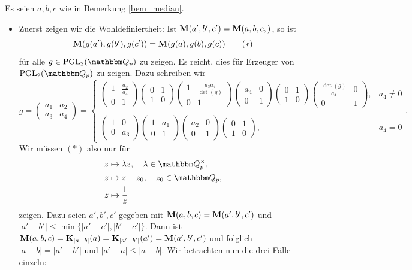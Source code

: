 \documentclass[a4paper, 12pt, twoside]{article}
\begin{document}
\bew Es seien $a,b,c$ wie in Bemerkung
\ref{bem_median}.
\begin{itemize}
\item Zuerst zeigen wir die Wohldefiniertheit:
Ist $\mathbf{M}(a',b',c')=\mathbf{M}(a,b,c,)$, so ist
\[
\mathbf{M}(g(a'),g(b'),g(c'))
=\mathbf{M}(g(a),g(b),g(c))
\qquad (*)
\]
für alle $g\in\PGL_2(\QQ_p)$ zu zeigen.
Es reicht, dies für Erzeuger von $\PGL_2(\QQ_p)$ zu zeigen.
Dazu schreiben wir
\[
g = \begin{pmatrix} a_1 & a_2 \\ a_3 & a_4 \end{pmatrix}
=
\left\{\begin{matrix}
\begin{pmatrix} 1 & \frac{a_2}{a_4} \\ 0 & 1 \end{pmatrix}
\begin{pmatrix} 0 & 1 \\ 1 & 0 \end{pmatrix}
\begin{pmatrix} 1 & \frac{a_3 a_4}{\det(g)} \\ 0 & 1 \end{pmatrix}
\begin{pmatrix} a_4 & 0 \\ 0 & 1 \end{pmatrix}
\begin{pmatrix} 0 & 1 \\ 1 & 0 \end{pmatrix}
\begin{pmatrix} \frac{\det(g)}{a_4} & 0 \\ 0 & 1 \end{pmatrix}, & a_4\neq 0 \\ \\
\begin{pmatrix} 1 & 0 \\ 0 & a_3 \end{pmatrix}
\begin{pmatrix} 1 & a_1 \\ 0 & 1 \end{pmatrix}
\begin{pmatrix} a_2 & 0 \\ 0 & 1 \end{pmatrix}
\begin{pmatrix} 0 & 1 \\ 1 & 0 \end{pmatrix}, & a_4=0
\end{matrix}\right..
\]
Wir müssen $(*)$ also nur für
\begin{align*}
&z\mapsto \lambda z,\quad \lambda \in \QQ_p^\times, \\
&z\mapsto z+z_0,\quad z_0 \in \QQ_p, \\
&z\mapsto\frac{1}{z}
\end{align*}
zeigen.
Dazu seien $a',b',c'$ gegeben mit $\mathbf{M}(a,b,c)=\mathbf{M}(a',b',c')$
und $|a'-b'|\leq\min\{|a'-c'|,|b'-c'|\}$.
Dann ist
$\mathbf{M}(a,b,c)=\mathbf{K}_{|a-b|}(a)=\mathbf{K}_{|a'-b'|}(a')=\mathbf{M}(a',b',c')$ und
folglich $|a-b|=|a'-b'|$ und $|a'-a|\leq|a-b|$.
Wir betrachten nun die drei Fälle einzeln:


\end{itemize}
\end{document}
